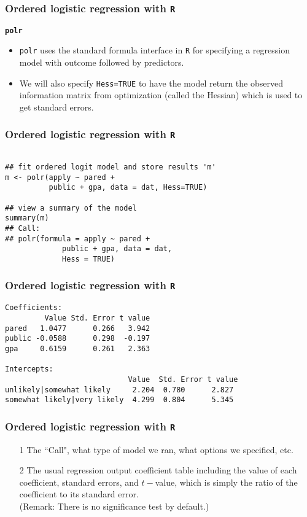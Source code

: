 \documentclass[00-GLMregslides.tex]{subfiles}
\begin{document}
\begin{frame}[fragile]
\frametitle{Ordered logistic regression with \texttt{R} }
	\Large
\textbf{\texttt{polr}}
\begin{itemize}
\item \texttt{polr} uses the standard formula interface in \texttt{R} for specifying a regression model with outcome 
followed by predictors. 
\item We will also specify \texttt{Hess=TRUE} to have the model return the observed information matrix from optimization (called the Hessian) which is used to get standard errors.
\end{itemize}
\end{frame}

\begin{frame}[fragile]
\frametitle{Ordered logistic regression with \texttt{R} }
\large
\begin{framed}		
\begin{verbatim}
	
## fit ordered logit model and store results 'm'
m <- polr(apply ~ pared + 
          public + gpa, data = dat, Hess=TRUE)

## view a summary of the model
summary(m)
## Call:
## polr(formula = apply ~ pared + 
             public + gpa, data = dat, 
             Hess = TRUE)
\end{verbatim}
\end{framed}
\end{frame}


\begin{frame}[fragile]
\frametitle{Ordered logistic regression with \texttt{R} }
	\normalsize
\begin{verbatim}
Coefficients:
         Value Std. Error t value
pared   1.0477      0.266   3.942
public -0.0588      0.298  -0.197
gpa     0.6159      0.261   2.363

Intercepts:
                            Value  Std. Error t value
unlikely|somewhat likely     2.204  0.780      2.827 
somewhat likely|very likely  4.299  0.804      5.345 

\end{verbatim}

\end{frame}

\begin{frame}[fragile]
\frametitle{Ordered logistic regression with \texttt{R} }
	\Large
\begin{itemize}
\item[1] The ``Call", what type of model we ran, what options we specified, etc.
\item[2] The usual regression output coefficient table including the value of each coefficient, standard errors, and 
$t-$value, which is simply the ratio of the coefficient to its standard error.\\ (Remark: There is no significance test by default.)
\end{itemize}
\end{frame}
\end{document}
